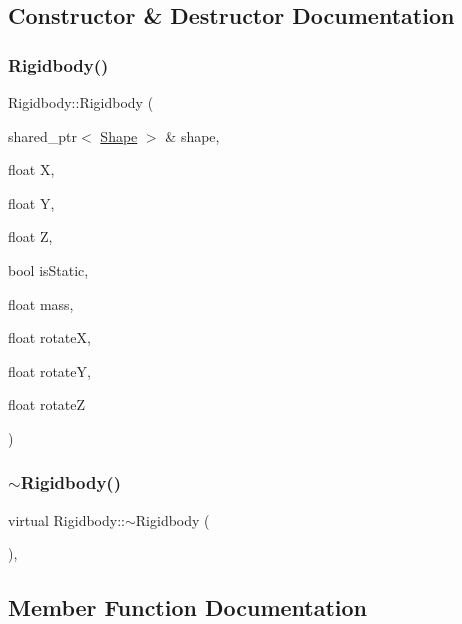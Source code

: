 \subsection{Constructor \& Destructor Documentation}
\mbox{\label{class_rigidbody_a583313febf979a0e72cbc59a5fcc2ab4}} 
\subsubsection{\texorpdfstring{Rigidbody()}{Rigidbody()}}
{\footnotesize\ttfamily Rigidbody\+::\+Rigidbody (\begin{DoxyParamCaption}\item[{shared\+\_\+ptr$<$ \mbox{\hyperlink{class_shape}{Shape}} $>$ \&}]{shape,  }\item[{float}]{X,  }\item[{float}]{Y,  }\item[{float}]{Z,  }\item[{bool}]{is\+Static,  }\item[{float}]{mass,  }\item[{float}]{rotateX,  }\item[{float}]{rotateY,  }\item[{float}]{rotateZ }\end{DoxyParamCaption})}

\mbox{\label{class_rigidbody_aeacb70ba57d80c85cfb6f5f50ebecf96}} 
\subsubsection{\texorpdfstring{$\sim$\+Rigidbody()}{~Rigidbody()}}
{\footnotesize\ttfamily virtual Rigidbody\+::$\sim$\+Rigidbody (\begin{DoxyParamCaption}{ }\end{DoxyParamCaption})\hspace{0.3cm}{\ttfamily [virtual]}, {\ttfamily [default]}}



\subsection{Member Function Documentation}
\mbox{\label{class_rigidbody_a189022541bfdf0717639e681934f996d}} 
